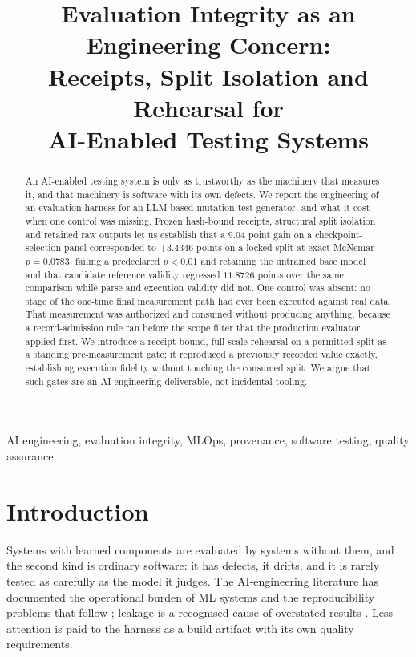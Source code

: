 \documentclass[10pt,conference]{IEEEtran}
\begin{document}
\title{Evaluation Integrity as an Engineering Concern:\\
Receipts, Split Isolation and Rehearsal for\\
AI-Enabled Testing Systems}

\author{\IEEEauthorblockN{}\IEEEauthorblockA{}}

\maketitle

\begin{abstract}
An AI-enabled testing system is only as trustworthy as the machinery that
measures it, and that machinery is software with its own defects. We report the
engineering of an evaluation harness for an LLM-based mutation test generator,
and what it cost when one control was missing. Frozen hash-bound receipts,
structural split isolation and retained raw outputs let us establish that a
$9.04$ point gain on a checkpoint-selection panel corresponded to $+3.4346$
points on a locked split at exact McNemar $p = 0.0783$, failing a predeclared
$p < 0.01$ and retaining the untrained base model --- and that candidate
reference validity regressed $11.8726$ points over the same comparison while
parse and execution validity did not. One control was absent: no stage of the
one-time final measurement path had ever been executed against real data. That
measurement was authorized and consumed without producing anything, because a
record-admission rule ran before the scope filter that the production evaluator
applied first. We introduce a receipt-bound, full-scale rehearsal on a permitted
split as a standing pre-measurement gate; it reproduced a previously recorded
value exactly, establishing execution fidelity without touching the consumed
split. We argue that such gates are an AI-engineering deliverable, not
incidental tooling.
\end{abstract}

\begin{IEEEkeywords}
AI engineering, evaluation integrity, MLOps, provenance, software testing,
quality assurance
\end{IEEEkeywords}

\section{Introduction}

Systems with learned components are evaluated by systems without them, and the
second kind is ordinary software: it has defects, it drifts, and it is rarely
tested as carefully as the model it judges. The AI-engineering literature has
documented the operational burden of ML systems
\cite{sculley2015debt,amershi2019seforml} and the reproducibility problems that
follow \cite{gundersen2018reproducibility,pineau2021reproducibility}; leakage is
a recognised cause of overstated results \cite{kapoor2023leakage}. Less
attention is paid to the harness as a build artifact with its own quality
requirements.
\end{document}
